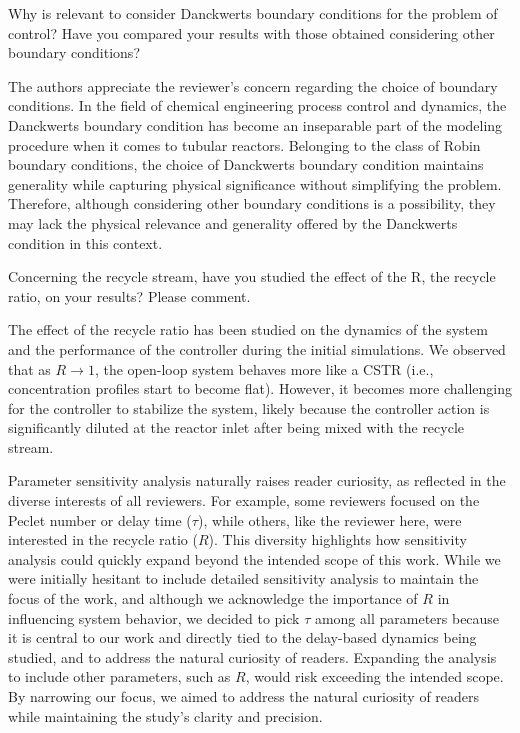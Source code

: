 \documentclass[11pt,answers]{exam}
\begin{document}
\begin{questions}

    \question Why is relevant to consider Danckwerts boundary conditions for the problem of control? Have you compared your results with those obtained considering other boundary conditions?

    \begin{solutionorbox} \label{comment:2_1}
        The authors appreciate the reviewer's concern regarding the choice of boundary conditions. In the field of chemical engineering process control and dynamics, the Danckwerts boundary condition has become an inseparable part of the modeling procedure when it comes to tubular reactors. Belonging to the class of Robin boundary conditions, the choice of Danckwerts boundary condition maintains generality while capturing physical significance without simplifying the problem. Therefore, although considering other boundary conditions is a possibility, they may lack the physical relevance and generality offered by the Danckwerts condition in this context.
    \end{solutionorbox}


    \question Concerning the recycle stream, have you studied the effect of the R, the recycle ratio, on your results? Please comment.

    \begin{solutionorbox} \label{comment:2_2}
        The effect of the recycle ratio has been studied on the dynamics of the system and the performance of the controller during the initial simulations. We observed that as \( R \to 1 \), the open-loop system behaves more like a CSTR (i.e., concentration profiles start to become flat). However, it becomes more challenging for the controller to stabilize the system, likely because the controller action is significantly diluted at the reactor inlet after being mixed with the recycle stream.

        Parameter sensitivity analysis naturally raises reader curiosity, as reflected in the diverse interests of all reviewers. For example, some reviewers focused on the Peclet number or delay time (\( \tau \)), while others, like the reviewer here, were interested in the recycle ratio (\( R \)). This diversity highlights how sensitivity analysis could quickly expand beyond the intended scope of this work. While we were initially hesitant to include detailed sensitivity analysis to maintain the focus of the work, and although we acknowledge the importance of \( R \) in influencing system behavior, we decided to pick \( \tau \) among all parameters because it is central to our work and directly tied to the delay-based dynamics being studied, and to address the natural curiosity of readers. Expanding the analysis to include other parameters, such as \( R \), would risk exceeding the intended scope. By narrowing our focus, we aimed to address the natural curiosity of readers while maintaining the study's clarity and precision. 
        

\end{solutionorbox}
\end{questions}
\end{document}
